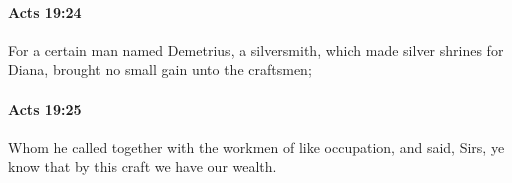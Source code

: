 		\paragraph{Acts 19:24} %
			\label{ACTS-19-24}

			For a certain man named Demetrius, a silversmith, which made silver shrines for Diana, brought no small gain unto the craftsmen;

			\begin{framed}
			\scriptsize
				\begin{compactdesc}
					\item[SBLG] 
				\end{compactdesc}
			\end{framed}

		\paragraph{Acts 19:25} %
			\label{ACTS-19-25}

			Whom he called together with the workmen of like occupation, and said, Sirs, ye know that by this craft we have our wealth.

